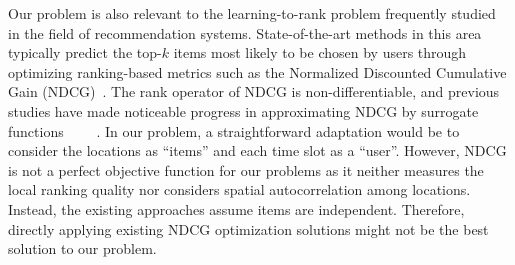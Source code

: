 \documentclass{article}
\begin{document}
Our problem is also relevant to the learning-to-rank problem frequently studied in the field of recommendation systems. State-of-the-art methods in this area typically predict the top-$k$ items most likely to be chosen by users through optimizing ranking-based metrics such as the Normalized Discounted Cumulative Gain (NDCG)~\cite{bhatia2015sparse}.
The rank operator of NDCG is non-differentiable, and previous studies have made noticeable progress in approximating NDCG by surrogate functions ~\cite{PiRank}~\cite{ApproxNDCG}~\cite{SoftRank}~\cite{Qiu2022LargescaleSO}. In our problem, a straightforward adaptation would be to consider the locations as ``items'' and each time slot as a ``user''. However, NDCG is not a perfect objective function for our problems as it neither measures the local ranking quality nor considers spatial autocorrelation among locations. Instead, the existing approaches assume items are independent. Therefore, directly applying existing NDCG optimization solutions might not be the best solution to our problem.
\end{document}
